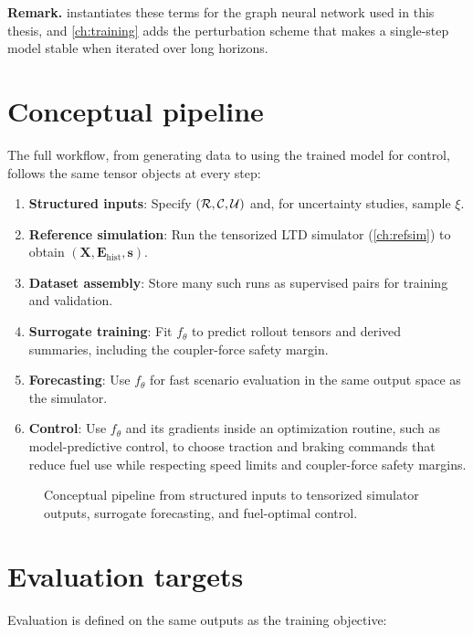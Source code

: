 \textbf{Remark.}  instantiates these terms for the graph neural network used in this thesis, and \cref{ch:training} adds the perturbation scheme that makes a single-step model stable when iterated over long horizons.

\section{Conceptual pipeline}

The full workflow, from generating data to using the trained model for control, follows the same tensor objects at every step:

\begin{enumerate}
    \item \textbf{Structured inputs}: Specify $(\mathcal{R},\mathcal{C},\mathcal{U})$ and, for uncertainty studies, sample $\xi$.
    \item \textbf{Reference simulation}: Run the tensorized LTD simulator (\cref{ch:refsim}) to obtain $(\mathbf{X},\mathbf{E}_{\mathrm{hist}},\mathbf{s})$.
    \item \textbf{Dataset assembly}: Store many such runs as supervised pairs for training and validation.
    \item \textbf{Surrogate training}: Fit $f_\theta$ to predict rollout tensors and derived summaries, including the coupler-force safety margin.
    \item \textbf{Forecasting}: Use $f_\theta$ for fast scenario evaluation in the same output space as the simulator.
    \item \textbf{Control}: Use $f_\theta$ and its gradients inside an optimization routine, such as model-predictive control, to choose traction and braking commands that reduce fuel use while respecting speed limits and coupler-force safety margins.
\end{enumerate}

\begin{figure}[h]
\centering
\caption{Conceptual pipeline from structured inputs to tensorized simulator outputs, surrogate forecasting, and fuel-optimal control.}
\label{fig:problem_pipeline}
\end{figure}

\section{Evaluation targets}

Evaluation is defined on the same outputs as the training objective:

